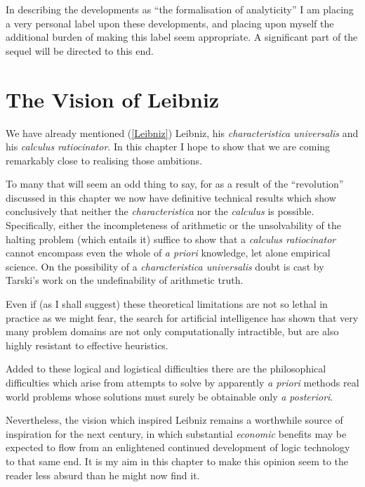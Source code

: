 In describing the developments as ``the formalisation of analyticity'' I am placing a very personal label upon these developments, and placing upon myself the additional burden of making this label seem appropriate.
A significant part of the sequel will be directed to this end.

\section{The Vision of Leibniz}

We have already mentioned (\ref{Leibniz}) Leibniz, his {\it characteristica universalis} and his {\it calculus ratiocinator}.
In this chapter I hope to show that we are coming remarkably close to realising those ambitions.

To many that will seem an odd thing to say, for as a result of the ``revolution'' discussed in this chapter we now have definitive technical results which show conclusively that neither the {\it characteristica} nor the {\it calculus} is possible.
Specifically, either the incompleteness of arithmetic or the unsolvability of the halting problem (which entails it) suffice to show that a {\it calculus ratiocinator} cannot encompass even the whole of {\it a priori} knowledge, let alone empirical science.
On the possibility of a {\it characteristica universalis} doubt is cast by Tarski's work on the undefinability of arithmetic truth.

Even if (as I shall suggest) these theoretical limitations are not so lethal in practice as we might fear, the search for artificial intelligence has shown that very many problem domains are not only computationally intractible, but are also highly resistant to effective heuristics.

Added to these logical and logistical difficulties there are the philosophical difficulties which arise from attempts to solve by apparently {\it a priori} methods real world problems whose solutions must surely be obtainable only {\it a posteriori}.

Nevertheless, the vision which inspired Leibniz remains a worthwhile source of inspiration for the next century, in which substantial {\it economic} benefits may be expected to flow from an enlightened continued development of logic technology to that same end.
It is my aim in this chapter to make this opinion seem to the reader less absurd than he might now find it.

